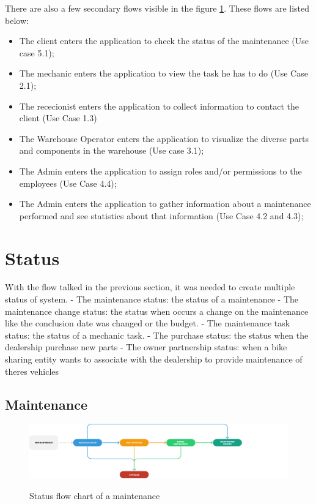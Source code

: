 There are also a few secondary flows visible in the figure \ref{fig:figure2}. 
These flows are listed below:
\begin{itemize}
  \item The client enters the application to check the status of the maintenance (Use case 5.1);
  \item The mechanic enters the application to view the task he has to do (Use Case 2.1); 
  \item The rececionist enters the application to collect information to contact the client (Use Case 1.3)
  \item The Warehouse Operator enters the application to visualize the diverse parts and components in the warehouse (Use case 3.1); 
  \item The Admin enters the application to assign roles and/or permissions to the employees (Use Case 4.4); 
  \item The Admin enters the application to gather information about a maintenance performed and see statistics about that information (Use Case 4.2 and 4.3); 
\end{itemize}

 

\section{Status} 

With the flow talked in the previous section, it was needed to create multiple status of system.
- The maintenance status: the status of a maintenance
- The maintenance change status: the status when occurs a change on the maintenance like the conclusion date was changed or the budget.
- The maintenance task status: the status of a mechanic task.
- The purchase status: the status when the dealership purchase new parts
- The owner partnership status: when a bike sharing entity wants to associate with the dealership to provide maintenance of theres vehicles

\subsection{Maintenance} 


\begin{figure}[h]
  \caption{Status flow chart of a maintenance}
  \centering
  \includegraphics[width=\textwidth]{figs/Status/Maintenance/StatusDiagram}
  \label{fig:figure2}
\end{figure}


